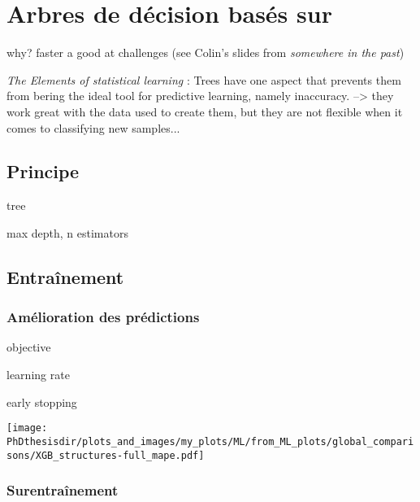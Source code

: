 \section{Arbres de décision basés sur \XGBOOST}\label{chapter-ML-section-XGB}




why? faster a good at challenges (see Colin's slides from \emph{somewhere in the past})

\emph{The Elements of statistical learning} : Trees have one aspect that prevents them from bering the ideal tool for predictive learning, namely inaccuracy.
--> they work great with the data used to create them, but they are not flexible when it comes to classifying new samples...
\subsection{Principe}
tree

max depth, n estimators

\subsection{Entraînement}
\subsubsection{Amélioration des prédictions}

objective

learning rate

early stopping

\texttt{[image: \\PhDthesisdir/plots\_and\_images/my\_plots/ML/from\_ML\_plots/global\_comparisons/XGB\_structures-full\_mape.pdf]}



\subsubsection{Surentraînement}





